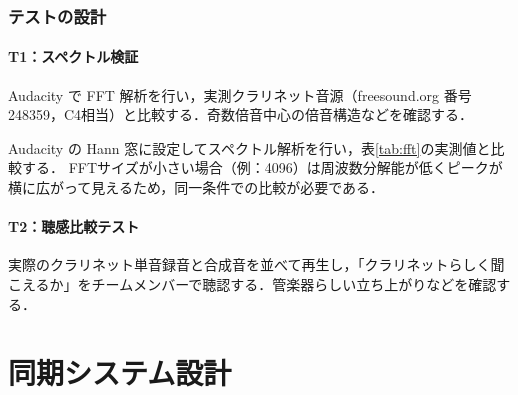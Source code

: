 \documentclass[uplatex,dvipdfmx,report]{jlreq}
\begin{document}
\section{テストの設計}

\subsection{T1：スペクトル検証}

Audacity で FFT 解析を行い，実測クラリネット音源（freesound.org 番号248359，C4相当）と比較する．奇数倍音中心の倍音構造などを確認する．

Audacity の Hann 窓に設定してスペクトル解析を行い，表\ref{tab:fft}の実測値と比較する．
FFTサイズが小さい場合（例：4096）は周波数分解能が低くピークが横に広がって見えるため，同一条件での比較が必要である．

\subsection{T2：聴感比較テスト}

実際のクラリネット単音録音と合成音を並べて再生し，「クラリネットらしく聞こえるか」をチームメンバーで聴認する．管楽器らしい立ち上がりなどを確認する．










































\part{同期システム設計}

\end{document}
